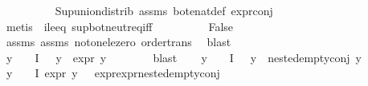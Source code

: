 \begin{isabellebody}
\ \ \ \ \ \ \ \ \isamarkupfalse%
\ Sup{\isacharunderscore}{\kern0pt}union{\isacharunderscore}{\kern0pt}distrib\ assms{\isacharparenleft}{\kern0pt}{}{\isacharparenright}{\kern0pt}\ bot{\isacharunderscore}{\kern0pt}enat{\isacharunderscore}{\kern0pt}def\ expr{\isacharunderscore}{\kern0pt}{}{\isacharunderscore}{\kern0pt}conj\isanewline
\ \ \ \ \ \ \ \ \isamarkupfalse%
\ {\isacharparenleft}{\kern0pt}metis\ \ ile{}{\isacharunderscore}{\kern0pt}eq\ sup{\isacharunderscore}{\kern0pt}bot{\isachardot}{\kern0pt}neutr{\isacharunderscore}{\kern0pt}eq{\isacharunderscore}{\kern0pt}iff{\isacharparenright}{\kern0pt}\isanewline
\ \ \ \ \ \ \isamarkupfalse%
\ \isamarkupfalse%
\ False\ \isanewline
\ \ \ \ \ \ \ \ \isamarkupfalse%
\ assms{\isacharparenleft}{\kern0pt}{}{\isacharparenright}{\kern0pt}\ assms{\isacharparenleft}{\kern0pt}{}{\isacharparenright}{\kern0pt}\ not{\isacharunderscore}{\kern0pt}one{\isacharunderscore}{\kern0pt}le{\isacharunderscore}{\kern0pt}zero\ order{\isacharunderscore}{\kern0pt}trans\ \isamarkupfalse%
\ blast\isanewline
\ \ \ \ \isamarkupfalse%
\isanewline
\ \ \isamarkupfalse%
\isanewline
\ \ \isamarkupfalse%
\ {\isachardoublequoteopen}{\isacharparenleft}{\kern0pt}{\isasymforall}y\ {\isasymin}\ {\isacharparenleft}{\kern0pt}{\isasymPhi}\ {\isacharbackquote}{\kern0pt}\ I{\isacharparenright}{\kern0pt}{\isachardot}{\kern0pt}\ {\isasympsi}\ {\isasymnoteq}\ y\ {\isasymlongrightarrow}\ expr{\isacharunderscore}{\kern0pt}{}\ y\ {\isasymle}\ {}{\isacharparenright}{\kern0pt}{\isachardoublequoteclose}\isanewline
\ \ \ \ \isamarkupfalse%
\ blast\isanewline
\isanewline
\ \ \isamarkupfalse%
\ {\isachardoublequoteopen}{\isacharparenleft}{\kern0pt}{\isasymforall}y\ {\isasymin}\ {\isacharparenleft}{\kern0pt}{\isasymPhi}\ {\isacharbackquote}{\kern0pt}\ I{\isacharparenright}{\kern0pt}{\isachardot}{\kern0pt}\ {\isasympsi}\ {\isasymnoteq}\ y\ {\isasymlongrightarrow}\ nested{\isacharunderscore}{\kern0pt}empty{\isacharunderscore}{\kern0pt}conj\ y{\isacharparenright}{\kern0pt}{\isachardoublequoteclose}\isanewline
\ \ \ \ \isamarkupfalse%
\ {\isacartoucheopen}{\isacharparenleft}{\kern0pt}{\isasymforall}y\ {\isasymin}\ {\isacharparenleft}{\kern0pt}{\isasymPhi}\ {\isacharbackquote}{\kern0pt}\ I{\isacharparenright}{\kern0pt}{\isachardot}{\kern0pt}\ expr{\isacharunderscore}{\kern0pt}{}\ y\ {\isasymle}\ {}{\isacharparenright}{\kern0pt}{\isacartoucheclose}\ expr{\isacharunderscore}{\kern0pt}{}{\isacharunderscore}{\kern0pt}{}{\isacharunderscore}{\kern0pt}expr{\isacharunderscore}{\kern0pt}{}{\isacharunderscore}{\kern0pt}{}{\isacharunderscore}{\kern0pt}nested{\isacharunderscore}{\kern0pt}empty{\isacharunderscore}{\kern0pt}conj\isanewline

\end{isabellebody}
